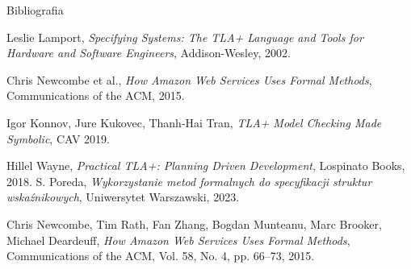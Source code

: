 \documentclass{purdue-poster}
\begin{document}
\begin{frame}{}
\begin{columns}[c]
\begin{column}{.48\linewidth}
\begin{block}{\large Bibliografia}
{\begin{thebibliography}{00}
            Leslie Lamport, \emph{Specifying Systems: The TLA+ Language and Tools for Hardware and Software Engineers}, Addison-Wesley, 2002.
        
            Chris Newcombe et al., \emph{How Amazon Web Services Uses Formal Methods}, Communications of the ACM, 2015.
        
            Igor Konnov, Jure Kukovec, Thanh-Hai Tran, \emph{TLA+ Model Checking Made Symbolic}, CAV 2019.
        
            Hillel Wayne, \emph{Practical TLA+: Planning Driven Development}, Lospinato Books, 2018.
            S. Poreda,
            \textit{Wykorzystanie metod formalnych do specyfikacji struktur wskaźnikowych},
            Uniwersytet Warszawski, 2023.

            Chris Newcombe, Tim Rath, Fan Zhang, Bogdan Munteanu, Marc Brooker, Michael Deardeuff, \emph{How Amazon Web Services Uses Formal Methods}, Communications of the ACM, Vol. 58, No. 4, pp. 66--73, 2015.
        \end{thebibliography}
        }
    \end{block}
    \end{column}
    \end{columns}
    \vfill
\end{frame}
\end{document}
